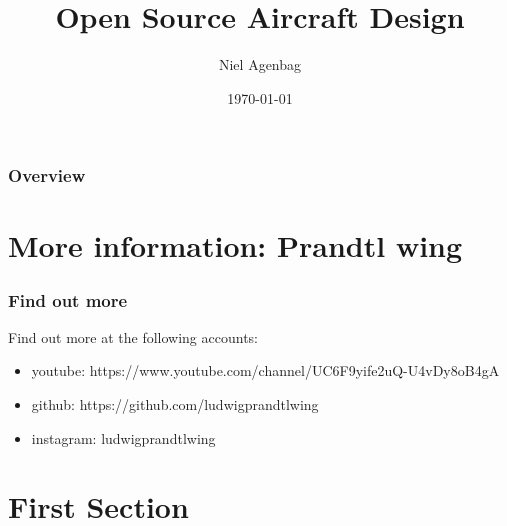 \documentclass{beamer}
\title[Open Aircraft Design]{Open Source Aircraft Design} %
\author{Niel Agenbag} %
\institute[Unaffiliated] %
{
Unaffiliated \\ %
\medskip
\textit{Ludwigprandtlwing@gmail.com or niel.agenbag@gmail.com} %
}
\date{\today} %
\begin{document}
\begin{frame}
\titlepage %
\end{frame}

\begin{frame}
\frametitle{Overview} %
\tableofcontents %
\end{frame}


\section{More information:  Prandtl wing}


\begin{frame}
\frametitle{Find out more}

Find out more at the following accounts:

\begin{itemize}
\item youtube:  https://www.youtube.com/channel/UC6F9yife2uQ-U4vDy8oB4gA
\item github:  https://github.com/ludwigprandtlwing
\item instagram:  ludwigprandtlwing
\end{itemize}
\end{frame}



\section{First Section} %
\end{document}
